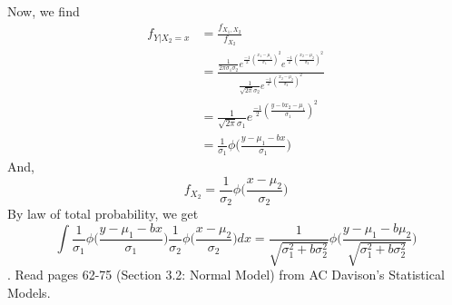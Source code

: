 \documentclass[11pt]{article}
\begin{document}
Now, we find
\begin{equation}
  \nonumber
  \begin{aligned}
    f_{Y | X_{2} = x} &= \frac{f_{X_{1}, X_{2}}}{f_{X_{2}}}\\
    & = \frac{\frac{1}{2\pi\sigma_{1}\sigma_{2}}e^{\frac{-1}{2}(\frac{x_{1} - \mu_{1}}{\sigma_{1}})^{2}}e^{\frac{-1}{2}(\frac{x_{2} - \mu_{2}}{\sigma_{2}})^{2}}}{\frac{1}{\sqrt{2\pi}\sigma_{2}} e^{\frac{-1}{2}(\frac{x_{2} - \mu_{2}}{\sigma_{2}})^{2}}}\\
    & = \frac{1}{\sqrt{2\pi}\sigma_{1}}e^{\frac{-1}{2}(\frac{y - bx_{2} - \mu_{1}}{\sigma_{1}})^{2}}\\
    & = \frac{1}{\sigma_{1}}\phi\bigg(\frac{y - \mu_{1} - bx}{\sigma_{1}}\bigg)
  \end{aligned}
\end{equation}
And,
\begin{equation}
  \nonumber
  f_{X_{2}} = \frac{1}{\sigma_{2}} \phi\bigg(\frac{x - \mu_{2}}{\sigma_{2}}\bigg)
\end{equation}
By law of total probability, we get
\begin{equation}
  \nonumber
  \int \frac{1}{\sigma_{1}} \phi\bigg(\frac{y - \mu_{1} - bx}{\sigma_{1}}\bigg) \frac{1}{\sigma_{2}} \phi\bigg(\frac{x - \mu_{2}}{\sigma_{2}}\bigg)dx = \frac{1}{\sqrt{\sigma_{1}^{2} + b \sigma_{2}^{2}}} \phi \bigg(\frac{y - \mu_{1} - b \mu_{2}}{\sqrt{\sigma_{1}^{2} + b \sigma_{2}^{2}}}\bigg)
\end{equation}
. Read pages 62-75 (Section 3.2: Normal Model) from AC Davison’s Statistical Models.
\end{document}
